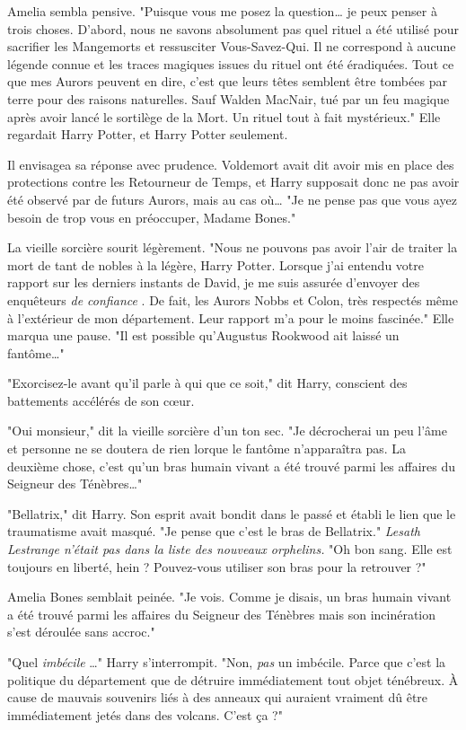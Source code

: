 Amelia sembla pensive. "Puisque vous me posez la question… je peux penser à trois choses. D'abord, nous ne savons absolument pas quel rituel a été utilisé pour sacrifier les Mangemorts et ressusciter Vous-Savez-Qui. Il ne correspond à aucune légende connue et les traces magiques issues du rituel ont été éradiquées. Tout ce que mes Aurors peuvent en dire, c'est que leurs têtes semblent être tombées par terre pour des raisons naturelles. Sauf Walden MacNair, tué par un feu magique après avoir lancé le sortilège de la Mort. Un rituel tout à fait mystérieux." Elle regardait Harry Potter, et Harry Potter seulement.

Il envisagea sa réponse avec prudence. Voldemort avait dit avoir mis en place des protections contre les Retourneur de Temps, et Harry supposait donc ne pas avoir été observé par de futurs Aurors, mais au cas où… "Je ne pense pas que vous ayez besoin de trop vous en préoccuper, Madame Bones."

La vieille sorcière sourit légèrement. "Nous ne pouvons pas avoir l'air de traiter la mort de tant de nobles à la légère, Harry Potter. Lorsque j'ai entendu votre rapport sur les derniers instants de David, je me suis assurée d'envoyer des enquêteurs \emph{de confiance} . De fait, les Aurors Nobbs et Colon, très respectés même à l'extérieur de mon département. Leur rapport m'a pour le moins fascinée." Elle marqua une pause. "Il est possible qu'Augustus Rookwood ait laissé un fantôme…"

"Exorcisez-le avant qu'il parle à qui que ce soit," dit Harry, conscient des battements accélérés de son cœur.

"Oui monsieur," dit la vieille sorcière d'un ton sec. "Je décrocherai un peu l'âme et personne ne se doutera de rien lorque le fantôme n'apparaîtra pas. La deuxième chose, c'est qu'un bras humain vivant a été trouvé parmi les affaires du Seigneur des Ténèbres…"

"Bellatrix," dit Harry. Son esprit avait bondit dans le passé et établi le lien que le traumatisme avait masqué. "Je pense que c'est le bras de Bellatrix." \emph{Lesath Lestrange n'était pas dans la liste des nouveaux orphelins.}  "Oh bon sang. Elle est toujours en liberté, hein ? Pouvez-vous utiliser son bras pour la retrouver ?"

Amelia Bones semblait peinée. "Je vois. Comme je disais, un bras humain vivant a été trouvé parmi les affaires du Seigneur des Ténèbres mais son incinération s'est déroulée sans accroc."

"Quel \emph{imbécile} …" Harry s'interrompit. "Non, \emph{pas}  un imbécile. Parce que c'est la politique du département que de détruire immédiatement tout objet ténébreux. À cause de mauvais souvenirs liés à des anneaux qui auraient vraiment dû être immédiatement jetés dans des volcans. C'est ça ?"

